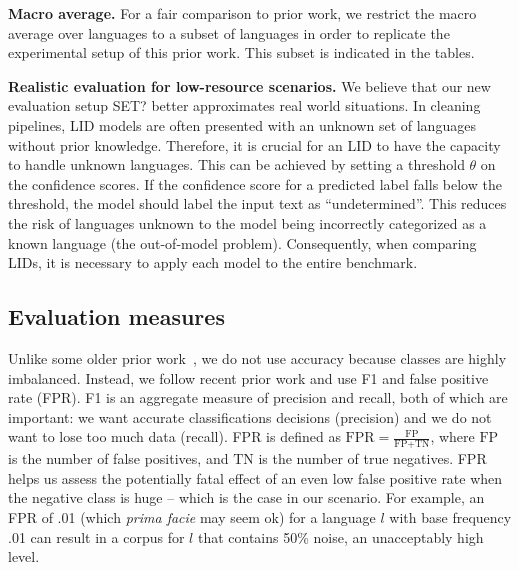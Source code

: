 \documentclass[11pt]{article}
\newcommand{\basequ}{SET?\xspace}
\def\seclabel#1{\label{sec:#1}\label{p:#1}}
\begin{document}
\textbf{Macro average.}
For a fair comparison to prior work,
we restrict 
the macro average over languages to a subset of languages in
order to replicate the experimental setup of this prior
work.
This subset is indicated in the tables.

\textbf{Realistic evaluation for low-resource scenarios.}
We believe that our new evaluation setup \basequ better
approximates real world situations. In cleaning pipelines, LID
models are often presented with an unknown set of languages
without prior knowledge. Therefore, it is crucial for an LID
to have the capacity to handle unknown languages. This
can be achieved by setting a threshold $\theta$ on the
confidence scores. If the confidence score for a predicted
label falls below the threshold, the model should label
the input text as ``undetermined''. This reduces the
risk of languages unknown to the model being incorrectly
categorized as a known language (the out-of-model problem).
Consequently, when comparing LIDs, it is necessary to apply
each model to the entire benchmark.

\subsection{Evaluation measures}\seclabel{measures}
Unlike some older prior work~\cite{jauhiainen2019automatic}, we do
not use accuracy because classes are highly imbalanced.
Instead, we follow recent prior work \cite{nllbteam2022language,burchell-etal-2023-open} and use F1 and false
positive rate (FPR). F1 is an aggregate measure of precision
and recall, both of which are important: we want accurate
classifications decisions (precision) and we do not want to
lose too much data (recall).
FPR is defined as \(\text{FPR} = \frac{{\text{FP}}}{{\text{FP} + \text{TN}}}\),
where \(\text{FP}\) is the number of false positives, and \(\text{TN}\) is the number of true negatives.
FPR helps us assess the
potentially fatal effect
of an even low false positive rate when the negative class is
huge -- which is the case in our scenario. For example, an
FPR of .01 (which \textsl{prima facie} may seem ok) for a
language $l$ with base frequency .01
can result in
a corpus for $l$ that contains 50\% noise, an unacceptably high
level.
\end{document}
